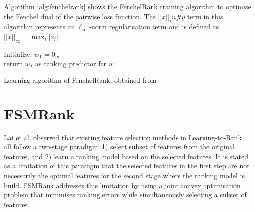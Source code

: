 Algorithm \ref{alg:fenchelrank} shows the FenchelRank training algorithm to optimise the Fenchel dual of the pairwise loss function. The $||x||_infty$ term in this algorithm represents an $\ell_\infty$-norm regularisation term and is defined as $||x||_\infty=\max_{i}|x_i|$.\\

\LinesNumbered
\begin{algorithm}[H]
 Initialize: $w_1$ = $0_m$\\
 return $w_{T}$ as ranking predictor for $w$
 \caption{Learning algorithm of FenchelRank, obtained from \cite{Lai2013}}
 \label{alg:fenchelrank}
\end{algorithm}
\section{FSMRank}
Lai et al. \cite{Lai2013c} observed that existing feature selection methods in Learning-to-Rank all follow a two-stage paradigm: 1) select subset of features from the original features, and 2) learn a ranking model based on the selected features. It is stated as a limitation of this paradigm that the selected features in the first step are not necessarily the optimal features for the second stage where the ranking model is build. FSMRank \cite{Lai2013c} addresses this limitation by using a joint convex optimisation problem that minimises ranking errors while simultaneously selecting a subset of features.\\

